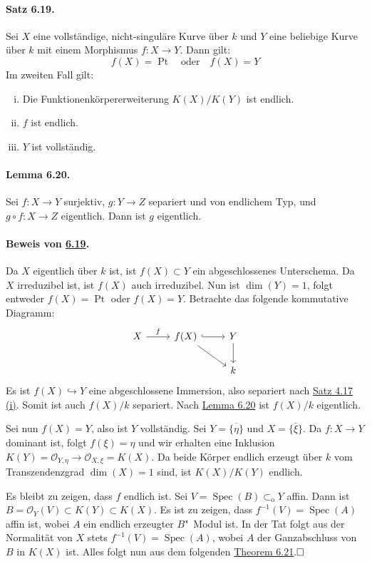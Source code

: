 \documentclass[11pt,b5paper,openany]{memoir}
\def \qed {$\hfill\square$}
\begin{document}
\paragraph{Satz 6.19.}\label{6.19} Sei $X$ eine vollständige, nicht-singuläre Kurve über $k$ und $Y$ eine beliebige Kurve über $k$ mit einem Morphismus $f:X\to Y$. Dann gilt:
\[f(X)=\operatorname{Pt} \quad\text{oder}\quad f(X)=Y \]
Im zweiten Fall gilt:
\begin{enumerate}[(i)]
\item Die Funktionenkörpererweiterung $K(X)/K(Y)$ ist endlich.
\item $f$ ist endlich.
\item $Y$ ist vollständig.
\end{enumerate}

\paragraph{Lemma 6.20.}\label{6.20} Sei $f:X\to Y$ surjektiv, $g:Y\to Z$ separiert und von endlichem Typ, und $g\circ f:X\to Z$ eigentlich. Dann ist $g$ eigentlich.

\paragraph{Beweis von \hyperref[6.19]{6.19}.} Da $X$ eigentlich über $k$ ist, ist $f(X)\subset Y$ ein abgeschlossenes Unterschema. Da $X$ irreduzibel ist, ist $f(X)$ auch irreduzibel. Nun ist $\dim(Y)=1$, folgt entweder $f(X)=\operatorname{Pt}$ oder $f(X)=Y$. Betrachte das folgende kommutative Diagramm:
\[\begin{tikzcd}
X \rar["f"] & f(X)\rar[hook]\ar[dr] & Y\dar\\
 & & k
\end{tikzcd} \]
Es ist $f(X)\hookrightarrow Y$ eine abgeschlossene Immersion, also separiert nach \hyperref[4.17]{Satz 4.17 (i)}. Somit ist auch $f(X)/ k$ separiert. Nach \hyperref[6.20]{Lemma 6.20} ist $f(X)/k$ eigentlich.

Sei nun $f(X)=Y$, also ist $Y$ vollständig. Sei $Y=\overline{\{\eta\}}$ und $X=\overline{\{\xi\}}$. Da $f:X\to Y$ dominant ist, folgt $f(\xi)=\eta$ und wir erhalten eine Inklusion $K(Y)=\mathcal{O}_{Y,\eta}\to\mathcal{O}_{X,\xi}=K(X)$. Da beide Körper endlich erzeugt über $k$ vom Transzendenzgrad $\dim(X)=1$ sind, ist $K(X)/K(Y)$ endlich.

Es bleibt zu zeigen, dass $f$ endlich ist. Sei $V=\operatorname{Spec}(B)\subset_\text{o}Y$ affin. Dann ist $B=\mathcal{O}_Y(V)\subset K(Y)\subset K(X)$. Es ist zu zeigen, dass $f^{-1}(V)=\operatorname{Spec}(A)$ affin ist, wobei $A$ ein endlich erzeugter $B$"~Modul ist. In der Tat folgt aus der Normalität von $X$ stets $f^{-1}(V)=\operatorname{Spec}(A)$, wobei $A$ der Ganzabschluss von $B$ in $K(X)$ ist. Alles folgt nun aus dem folgenden \hyperref[6.21]{Theorem 6.21}.\qed
\end{document}
